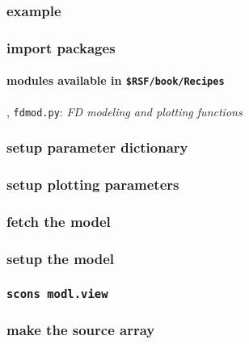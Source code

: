 \begin{frame} \frametitle{example}
  \vfill
\end{frame}
\cwpnote{}

\begin{frame} \frametitle{import packages}
  \framesubtitle{modules available in \texttt{\$RSF/book/Recipes} }
  \sep
  \texttt{fdmod.py}: \textit{FD modeling and plotting functions}

\end{frame}
\cwpnote{}

\begin{frame} \frametitle{setup parameter dictionary}
\end{frame}
\cwpnote{}


\begin{frame} \frametitle{setup plotting parameters}
\end{frame}
\cwpnote{}

\begin{frame} \frametitle{fetch the model}
\end{frame}
\cwpnote{}

\begin{frame} \frametitle{setup the model}
\end{frame}
\cwpnote{}

\begin{frame} \frametitle{\texttt{scons modl.view}} 
\end{frame}

\begin{frame} \frametitle{make the source array}
\end{frame}
\cwpnote{}

